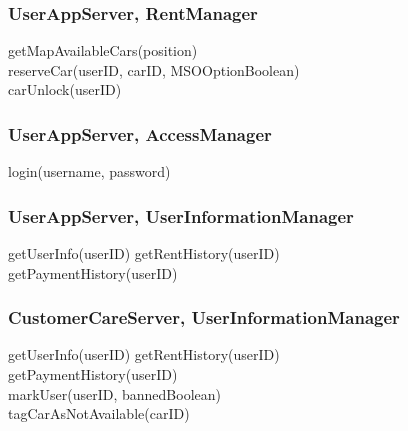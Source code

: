 \subsubsection{UserAppServer, RentManager}
getMapAvailableCars(position) \\
reserveCar(userID, carID, MSOOptionBoolean) \\
carUnlock(userID) \\

\subsubsection{UserAppServer, AccessManager}
login(username, password) %

\subsubsection{UserAppServer, UserInformationManager}
getUserInfo(userID)
getRentHistory(userID) \\
getPaymentHistory(userID) \\

\subsubsection{CustomerCareServer, UserInformationManager}
getUserInfo(userID)
getRentHistory(userID) \\
getPaymentHistory(userID) \\
markUser(userID, bannedBoolean) \\
tagCarAsNotAvailable(carID) \\










